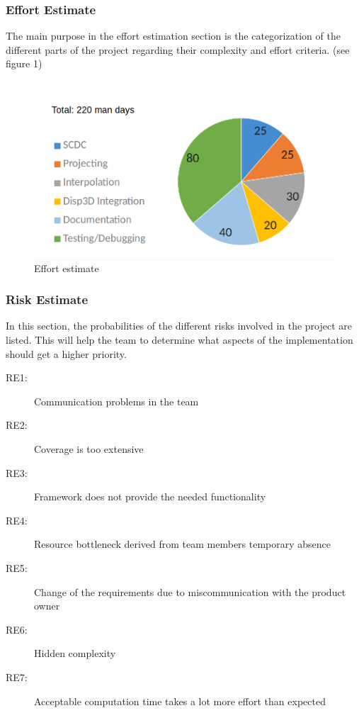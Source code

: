 \newpage

\subsubsection{Effort Estimate}
The main purpose in the effort estimation section is the categorization of the different parts of the project regarding their complexity and effort criteria.  
 (see figure 1)

\begin{figure}[h]
	\begin{center}
		\includegraphics[width= 14cm]{figures/aufwandsabschaetzung.png}
		\caption{Effort estimate}
	\end{center}
\end{figure}

\clearpage

\subsubsection{Risk Estimate}
In this section, the probabilities of the different risks involved in the project are listed. This will help the team to determine what aspects of the implementation should get a higher priority.

\begin{description}
	\item[RE1:] Communication problems in the team
	\item[RE2:] Coverage is too extensive
	\item[RE3:] Framework does not provide the needed functionality 
	\item[RE4:] Resource bottleneck derived from team members temporary absence 
	\item[RE5:] Change of the requirements due to miscommunication with the product owner 
	\item[RE6:] Hidden complexity 
	\item[RE7:] Acceptable computation time takes a lot more effort than expected  
\end{description}

